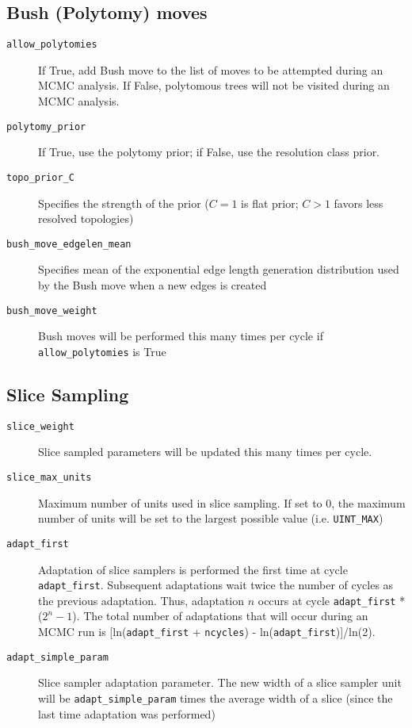 \documentclass[10pt]{article}
\begin{document}
\subsection{Bush (Polytomy) moves}
\begin{description}
\item[{\tt allow\_polytomies}] If True, add Bush move to the list of moves to be attempted during an MCMC analysis. If False, polytomous trees will not be visited during an MCMC analysis.
\item[{\tt polytomy\_prior}] If True, use the polytomy prior; if False, use the resolution class prior.
\item[{\tt topo\_prior\_C}] Specifies the strength of the prior ($C = 1$ is flat prior; $C > 1$ favors less resolved topologies)
\item[{\tt bush\_move\_edgelen\_mean}] Specifies mean of the exponential edge length generation distribution used by the Bush move when a new edges is created
\item[{\tt bush\_move\_weight}] Bush moves will be performed this many times per cycle if \verb+allow_polytomies+ is True
\end{description}

\subsection{Slice Sampling}
\begin{description}
\item[{\tt slice\_weight}] Slice sampled parameters will be updated this many times per cycle.
\item[{\tt slice\_max\_units}] Maximum number of units used in slice sampling. If set to 0, the maximum number of units will be set to the largest possible value (i.e. \verb+UINT_MAX+)
\item[{\tt adapt\_first}] Adaptation of slice samplers is performed the first time at cycle \verb+adapt_first+. Subsequent adaptations wait twice the number of cycles as the previous adaptation. Thus, adaptation $n$ occurs at cycle \verb+adapt_first+ * ($2^n - 1$). The total number of adaptations that will occur during an MCMC run is [ln(\verb+adapt_first+ + \verb+ncycles+) - ln(\verb+adapt_first+)]/ln(2).
\item[{\tt adapt\_simple\_param}] Slice sampler adaptation parameter. The new width of a slice sampler unit will be \verb+adapt_simple_param+ times the average width of a slice (since the last time adaptation was performed)
\end{description}
\end{document}
